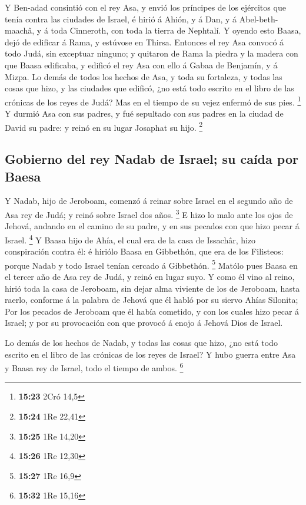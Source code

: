  Y Ben-adad consintió con el rey Asa, y envió los príncipes
de los ejércitos que tenía contra las ciudades de Israel, é hirió á
Ahión, y á Dan, y á Abel-beth-maachâ, y á toda Cinneroth, con toda la
tierra de Nephtalí.  Y oyendo esto Baasa, dejó de edificar
á Rama, y estúvose en Thirsa.  Entonces el rey Asa convocó
á todo Judá, sin exceptuar ninguno; y quitaron de Rama la piedra y la
madera con que Baasa edificaba, y edificó el rey Asa con ello á Gabaa de
Benjamín, y á Mizpa.  Lo demás de todos los hechos de Asa,
y toda su fortaleza, y todas las cosas que hizo, y las ciudades que
edificó, ¿no está todo escrito en el libro de las crónicas de los reyes
de Judá? Mas en el tiempo de su vejez enfermó de sus pies. \footnote{\textbf{15:23}
  2Cró 14,5}  Y durmió Asa con sus padres, y fué sepultado
con sus padres en la ciudad de David su padre: y reinó en su lugar
Josaphat su hijo. \footnote{\textbf{15:24} 1Re 22,41}

\hypertarget{gobierno-del-rey-nadab-de-israel-su-cauxedda-por-baesa}{%
\subsection{Gobierno del rey Nadab de Israel; su caída por
Baesa}\label{gobierno-del-rey-nadab-de-israel-su-cauxedda-por-baesa}}

 Y Nadab, hijo de Jeroboam, comenzó á reinar sobre Israel
en el segundo año de Asa rey de Judá; y reinó sobre Israel dos años.
\footnote{\textbf{15:25} 1Re 14,20}  E hizo lo malo ante
los ojos de Jehová, andando en el camino de su padre, y en sus pecados
con que hizo pecar á Israel. \footnote{\textbf{15:26} 1Re 12,30}
 Y Baasa hijo de Ahía, el cual era de la casa de Issachâr,
hizo conspiración contra él: é hiriólo Baasa en Gibbethón, que era de
los Filisteos: porque Nadab y todo Israel tenían cercado á Gibbethón.
\footnote{\textbf{15:27} 1Re 16,9}  Matólo pues Baasa en el
tercer año de Asa rey de Judá, y reinó en lugar suyo.  Y
como él vino al reino, hirió toda la casa de Jeroboam, sin dejar alma
viviente de los de Jeroboam, hasta raerlo, conforme á la palabra de
Jehová que él habló por su siervo Ahías Silonita;  Por los
pecados de Jeroboam que él había cometido, y con los cuales hizo pecar á
Israel; y por su provocación con que provocó á enojo á Jehová Dios de
Israel.

 Lo demás de los hechos de Nadab, y todas las cosas que
hizo, ¿no está todo escrito en el libro de las crónicas de los reyes de
Israel?  Y hubo guerra entre Asa y Baasa rey de Israel,
todo el tiempo de ambos. \footnote{\textbf{15:32} 1Re 15,16}

